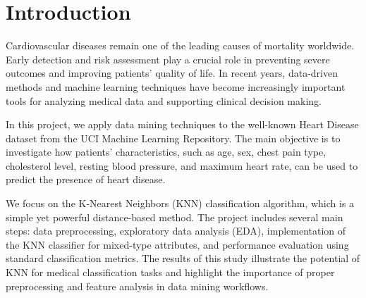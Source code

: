 \section{Introduction}
Cardiovascular diseases remain one of the leading causes of mortality worldwide.
Early detection and risk assessment play a crucial role in preventing severe outcomes and improving
patients' quality of life. In recent years, data-driven methods and machine learning techniques have
become increasingly important tools for analyzing medical data and supporting clinical decision making.

In this project, we apply data mining techniques to the well-known Heart Disease dataset from the
UCI Machine Learning Repository. The main objective is to investigate how patients' characteristics,
such as age, sex, chest pain type, cholesterol level, resting blood pressure, and maximum heart rate,
can be used to predict the presence of heart disease.

We focus on the K-Nearest Neighbors (KNN) classification algorithm, which is a simple yet powerful
distance-based method. The project includes several main steps: data preprocessing, exploratory data analysis (EDA),
implementation of the KNN classifier for mixed-type attributes, and performance evaluation
using standard classification metrics. The results of this study illustrate the potential of
KNN for medical classification tasks and highlight the importance of proper preprocessing
and feature analysis in data mining workflows.